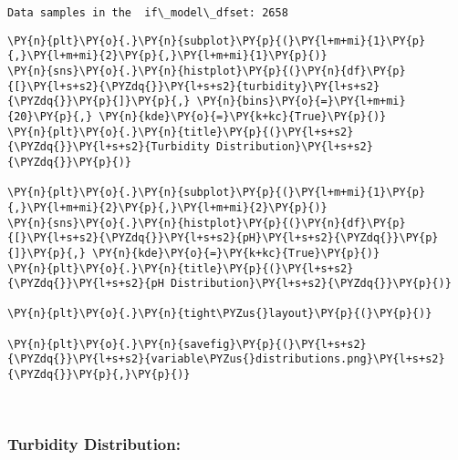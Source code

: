     \begin{Verbatim}[commandchars=\\\{\}]
Data samples in the  if\_model\_dfset: 2658
    \end{Verbatim}

    \begin{tcolorbox}[breakable, size=fbox, boxrule=1pt, pad at break*=1mm,colback=cellbackground, colframe=cellborder]
\begin{Verbatim}[commandchars=\\\{\}]
\PY{n}{plt}\PY{o}{.}\PY{n}{subplot}\PY{p}{(}\PY{l+m+mi}{1}\PY{p}{,}\PY{l+m+mi}{2}\PY{p}{,}\PY{l+m+mi}{1}\PY{p}{)}
\PY{n}{sns}\PY{o}{.}\PY{n}{histplot}\PY{p}{(}\PY{n}{df}\PY{p}{[}\PY{l+s+s2}{\PYZdq{}}\PY{l+s+s2}{turbidity}\PY{l+s+s2}{\PYZdq{}}\PY{p}{]}\PY{p}{,} \PY{n}{bins}\PY{o}{=}\PY{l+m+mi}{20}\PY{p}{,} \PY{n}{kde}\PY{o}{=}\PY{k+kc}{True}\PY{p}{)}
\PY{n}{plt}\PY{o}{.}\PY{n}{title}\PY{p}{(}\PY{l+s+s2}{\PYZdq{}}\PY{l+s+s2}{Turbidity Distribution}\PY{l+s+s2}{\PYZdq{}}\PY{p}{)}

\PY{n}{plt}\PY{o}{.}\PY{n}{subplot}\PY{p}{(}\PY{l+m+mi}{1}\PY{p}{,}\PY{l+m+mi}{2}\PY{p}{,}\PY{l+m+mi}{2}\PY{p}{)}
\PY{n}{sns}\PY{o}{.}\PY{n}{histplot}\PY{p}{(}\PY{n}{df}\PY{p}{[}\PY{l+s+s2}{\PYZdq{}}\PY{l+s+s2}{pH}\PY{l+s+s2}{\PYZdq{}}\PY{p}{]}\PY{p}{,} \PY{n}{kde}\PY{o}{=}\PY{k+kc}{True}\PY{p}{)}
\PY{n}{plt}\PY{o}{.}\PY{n}{title}\PY{p}{(}\PY{l+s+s2}{\PYZdq{}}\PY{l+s+s2}{pH Distribution}\PY{l+s+s2}{\PYZdq{}}\PY{p}{)}

\PY{n}{plt}\PY{o}{.}\PY{n}{tight\PYZus{}layout}\PY{p}{(}\PY{p}{)}

\PY{n}{plt}\PY{o}{.}\PY{n}{savefig}\PY{p}{(}\PY{l+s+s2}{\PYZdq{}}\PY{l+s+s2}{variable\PYZus{}distributions.png}\PY{l+s+s2}{\PYZdq{}}\PY{p}{,}\PY{p}{)}
\end{Verbatim}
\end{tcolorbox}

    \begin{center}
    \end{center}
    { \hspace*{\fill} \\}
    
    \hypertarget{turbidity-distribution}{%
\subsubsection{Turbidity Distribution:}\label{turbidity-distribution}}


